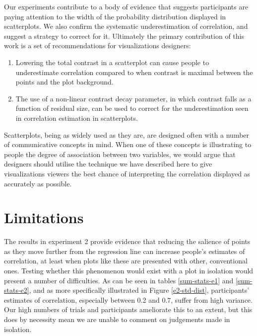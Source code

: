 \documentclass[preprint, 3p,
authoryear]{elsarticle} %
\begin{document}
Our experiments contribute to a body of evidence that suggests
participants are paying attention to the width of the probability
distribution displayed in scatterplots. We also confirm the systematic
underestimation of correlation, and suggest a strategy to correct for
it. Ultimately the primary contribution of this work is a set of
recommendations for visualizations designers:

\begin{enumerate}
\def\labelenumi{\arabic{enumi}.}
\item
  Lowering the total contrast in a scatterplot can cause people to
  underestimate correlation compared to when contrast is maximal between
  the points and the plot background.
\item
  The use of a non-linear contrast decay parameter, in which contrast
  falls as a function of residual size, can be used to correct for the
  underestimation seen in correlation estimation in scatterplots.
\end{enumerate}

Scatterplots, being as widely used as they are, are designed often with
a number of communicative concepts in mind. When one of these concepts
is illustrating to people the degree of association between two
variables, we would argue that designers should utilise the technique we
have described here to give visualizations viewers the best chance of
interpreting the correlation displayed as accurately as possible.

\hypertarget{limitations}{%
\section{Limitations}\label{limitations}}

The results in experiment 2 provide evidence that reducing the salience
of points as they move further from the regression line can increase
people's estimates of correlation, at least when plots like these are
presented with other, conventional ones. Testing whether this phenomenon
would exist with a plot in isolation would present a number of
difficulties. As can be seen in tables \ref{sum-stats-e1} and
\ref{sum-stats-e2}, and as more specifically illustrated in Figure
\ref{e2-std-dist}, participants' estimates of correlation, especially
between 0.2 and 0.7, suffer from high variance. Our high numbers of
trials and participants ameliorate this to an extent, but this does by
necessity mean we are unable to comment on judgements made in isolation.
\end{document}
